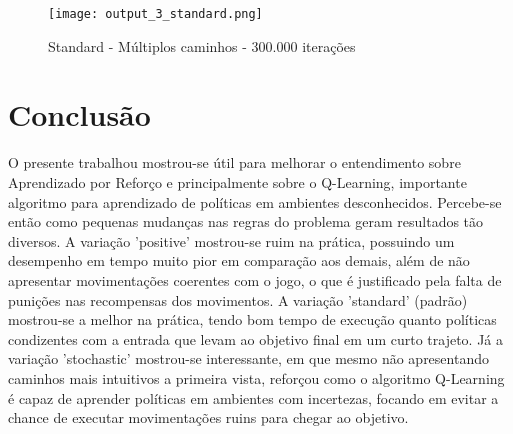 \documentclass[10pt]{extarticle} %
\begin{document}
\begin{figure}[H]
    \centering
    \texttt{[image: output\_3\_standard.png]}
    \caption{Standard - Múltiplos caminhos - 300.000 iterações}
    \label{fig:enter-label}
\end{figure}

\section{Conclusão}

O presente trabalhou mostrou-se útil para melhorar o entendimento sobre Aprendizado por Reforço e principalmente sobre o Q-Learning, importante algoritmo para aprendizado de políticas em ambientes desconhecidos. Percebe-se então como pequenas mudanças nas regras do problema geram resultados tão diversos. A variação 'positive' mostrou-se ruim na prática, possuindo um desempenho em tempo muito pior em comparação aos demais, além de não apresentar movimentações coerentes com o jogo, o que é justificado pela falta de punições nas recompensas dos movimentos. A variação 'standard' (padrão) mostrou-se a melhor na prática, tendo bom tempo de execução quanto políticas condizentes com a entrada que levam ao objetivo final em um curto trajeto. Já a variação 'stochastic' mostrou-se interessante, em que mesmo não apresentando caminhos mais intuitivos a primeira vista, reforçou como o algoritmo Q-Learning é capaz de aprender políticas em ambientes com incertezas, focando em evitar a chance de executar movimentações ruins para chegar ao objetivo. 
\end{document}
